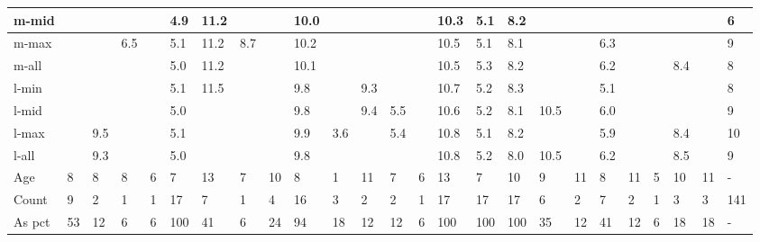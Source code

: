 \documentclass[10pt,letterpaper]{article}
\begin{document}
{\begin{tabular}{|l|l|l|l|l|l|l|l|l|l|l|l|l|l|l|l|l|l|l|l|l|l|l|l|l|}
        m-mid         & ~   &    &    & ~  &4.9 &11.2&     & ~   &10.0 & ~   &~    & ~   &     &10.3 & 5.1 & 8.2 & ~   &     &  ~  & ~   & ~  & ~   & ~   &  6 \\ \hline
        m-max         &     &    &6.5 & ~  &5.1 &11.2&8.7  &     &10.2 & ~   &~    &     &     &10.5 & 5.1 & 8.1 & ~   & ~   & 6.3 & ~   & ~  & ~   & ~   &  9  \\ \hline
        m-all         &     &    &    & ~  &5.0 &11.2&     &     &10.1 & ~   &~    &     &     &10.5 & 5.3 & 8.2 & ~   & ~   & 6.2 & ~   & ~  & 8.4 & ~   &  8  \\ \hline
        l-min         &     &    &    & ~  &5.1 &11.5&     &     & 9.8 & ~   &9.3  &     &     &10.7 & 5.2 & 8.3 & ~   & ~   & 5.1 & ~   & ~  & ~   & ~   &  8  \\ \hline
        l-mid         & ~   &    &    & ~  &5.0 & ~  &     & ~   & 9.8 & ~   &9.4  & 5.5 &     &10.6 & 5.2 & 8.1 &10.5 &     & 6.0 & ~   & ~  & ~   & ~   &  9  \\ \hline
        l-max         &     &9.5 &    & ~  &5.1 & ~  &     &     & 9.9 & 3.6 &~    & 5.4 &     &10.8 & 5.1 & 8.2 & ~   & ~   & 5.9 & ~   & ~  & 8.4 & ~   &  10  \\ \hline
        l-all         & ~   &9.3 &    & ~  &5.0 & ~  &     & ~   & 9.8 & ~   &     & ~   &     &10.8 & 5.2 & 8.0 &10.5 &     & 6.2 & ~   & ~  & 8.5 & ~   &  9  \\ \hline
        Age           & 8   &  8 & 8  & 6  & 7  & 13 & 7   & 10  & 8   & 1   &11   & 7   & 6   & 13  & 7   & 10  & 9   & 11  & 8  & 11   & 5   & 10 & 11  &  -  \\ \hline
        Count         & 9   &  2 & 1  & 1  &17  & 7  & 1   & 4   & 16  & 3   &2    & 2   & 1   &17   & 17  & 17  & 6   & 2   & 7  &  2   & 1   & 3  & 3   & 141 \\ \hline
        As pct        & 53  & 12 & 6  & 6  &100 & 41 & 6   & 24  & 94  & 18  &12   & 12  & 6   &100  & 100 & 100 & 35  & 12  & 41 &  12  & 6   & 18 & 18  & -  \\ \hline
    \end{tabular}
\label{table10}
}
\end{document}
